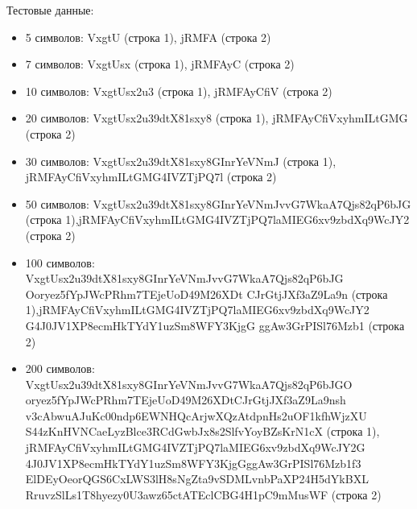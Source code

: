 \documentclass[12pt]{report}
\begin{document}
Тестовые данные:
\begin{itemize}
\item 5 символов:\newline
VxgtU (строка 1),\newline
jRMFA (строка 2)
\item 7 символов:\newline
VxgtUsx (строка 1),\newline
jRMFAyC (строка 2)
\item 10 символов:\newline
VxgtUsx2u3 (строка 1),\newline
jRMFAyCfiV (строка 2)
\item 20 символов:\newline
VxgtUsx2u39dtX81sxy8 (строка 1),\newline
jRMFAyCfiVxyhmILtGMG (строка 2)
\item 30 символов:\newline
VxgtUsx2u39dtX81sxy8GInrYeVNmJ (строка 1),\newline
jRMFAyCfiVxyhmILtGMG4IVZTjPQ7l (строка 2)
\item 50 символов:\newline
VxgtUsx2u39dtX81sxy8GInrYeVNmJvvG7WkaA7Qjs82qP6bJG (строка 1),\newline jRMFAyCfiVxyhmILtGMG4IVZTjPQ7laMIEG6xv9zbdXq9WcJY2 (строка 2)
\item 100 символов:\newline
VxgtUsx2u39dtX81sxy8GInrYeVNmJvvG7WkaA7Qjs82qP6bJG\newline
Ooryez5fYpJWcPRhm7TEjeUoD49M26XDt CJrGtjJXf3aZ9La9n (строка 1),\newline jRMFAyCfiVxyhmILtGMG4IVZTjPQ7laMIEG6xv9zbdXq9WcJY2\newline
G4J0JV1XP8ecmHkTYdY1uzSm8WFY3KjgG ggAw3GrPISl76Mzb1 (строка 2)
\item 200 символов:\newline
VxgtUsx2u39dtX81sxy8GInrYeVNmJvvG7WkaA7Qjs82qP6bJGO\newline
oryez5fYpJWcPRhm7TEjeUoD49M26XDtCJrGtjJXf3aZ9La9nsh\newline
v3cAbwuAJuKc00ndp6EWNHQcArjwXQzAtdpnHs2uOF1kfhWjzXU\newline
S44zKnHVNCaeLyzBlce3RCdGwbJx8s2SlfvYoyBZsKrN1cX (строка 1),\newline
jRMFAyCfiVxyhmILtGMG4IVZTjPQ7laMIEG6xv9zbdXq9WcJY2G\newline
4J0JV1XP8ecmHkTYdY1uzSm8WFY3KjgGggAw3GrPISl76Mzb1f3\newline
ElDEyOeorQGS6CxLWS3lH8sNgZta9vSDMLvnbPaXP24H5dYkBXL\newline
RruvzSlLs1T8hyezy0U3awz65ctATEclCBG4H1pC9mMusWF (строка 2)
\end{itemize}
\end{document}
